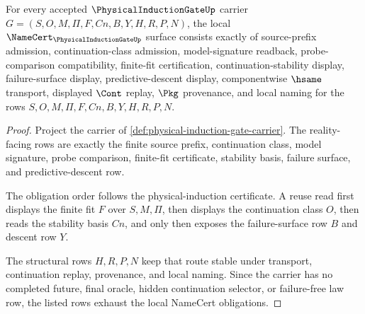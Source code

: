 \begin{theorem}
\label{thm:physical-induction-gate-namecert-obligations}
For every accepted $\PhysicalInductionGateUp$ carrier $G=(S,O,M,\Pi,F,Cn,B,Y,H,R,P,N)$, the local $\NameCert_{\PhysicalInductionGateUp}$ surface consists exactly of source-prefix admission, continuation-class admission, model-signature readback, probe-comparison compatibility, finite-fit certification, continuation-stability display, failure-surface display, predictive-descent display, componentwise $\hsame$ transport, displayed $\Cont$ replay, $\Pkg$ provenance, and local naming for the rows $S,O,M,\Pi,F,Cn,B,Y,H,R,P,N$.
\end{theorem}
\begin{proof}
Project the carrier of \autoref{def:physical-induction-gate-carrier}. The reality-facing rows are exactly the finite source prefix, continuation class, model signature, probe comparison, finite-fit certificate, stability basis, failure surface, and predictive-descent row.

The obligation order follows the physical-induction certificate. A reuse read first displays the finite fit $F$ over $S,M,\Pi$, then displays the continuation class $O$, then reads the stability basis $Cn$, and only then exposes the failure-surface row $B$ and descent row $Y$.

The structural rows $H,R,P,N$ keep that route stable under transport, continuation replay, provenance, and local naming. Since the carrier has no completed future, final oracle, hidden continuation selector, or failure-free law row, the listed rows exhaust the local NameCert obligations.
\end{proof}

